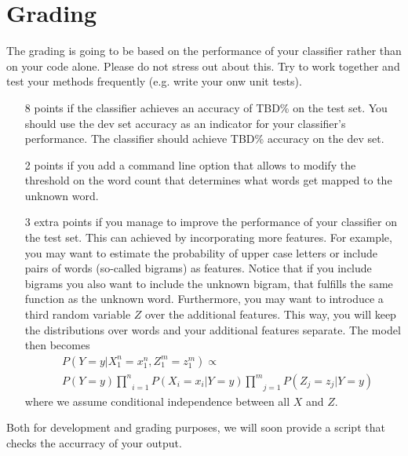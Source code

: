 \documentclass[11pt, leqno, a4paper]{article}
\begin{document}
\section{Grading}
The grading is going to be based on the performance of your classifier rather
than on your code alone. Please do not stress out about this. Try to work
together and test your methods frequently (e.g. write your onw unit tests).
\begin{itemize}
\item[8 points] if the classifier achieves an accuracy of TBD\% on the test set. You
should use the dev set accuracy as an indicator for your classifier’s
performance. The classifier should achieve TBD\% accuracy on the
dev set.
\item[2 points] if you add a command line option that allows to modify the threshold
on the word count that determines what words get mapped to the
unknown word.
\item[3 extra points] if you manage to improve the performance of your classifier on the test
set. This can achieved by incorporating more features. For example,
you may want to estimate the probability of upper case letters or
include pairs of words (so-called bigrams) as features. Notice that if
you include bigrams you also want to include the unknown bigram,
that fulfills the same function as the unknown word. Furthermore, you may want to introduce
a third random variable $ Z $ over the additional features. This way, you will keep the 
distributions over words and your additional features separate. The model then becomes
\begin{align*}
&P(Y=y|X_{1}^{n}=x_{1}^{n},Z_{1}^{m}=z_{1}^{m}) \propto \\ &P(Y=y)\underset{i=1}{\overset{n}{\prod}} P(X_{i}=x_{i}|Y=y)\underset{j=1}{\overset{m}{\prod}}P(Z_{j}=z_{j}|Y=y)
\end{align*}
where we assume conditional independence between
all $ X $ and $ Z $.
\end{itemize}

Both for development and grading purposes, we will soon provide a script that checks the accurracy
of your output.
\end{document}
